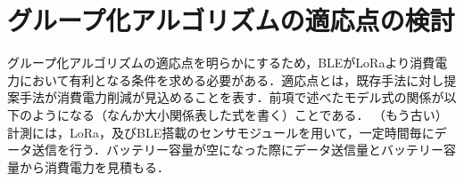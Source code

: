 \section{グループ化アルゴリズムの適応点の検討}
グループ化アルゴリズムの適応点を明らかにするため，BLEがLoRaより消費電力において有利となる条件を求める必要がある．適応点とは，既存手法に対し提案手法が消費電力削減が見込めることを表す．前項で述べたモデル式の関係が以下のようになる（なんか大小関係表した式を書く）ことである．
（もう古い）
計測には，LoRa，及びBLE搭載のセンサモジュールを用いて，一定時間毎にデータ送信を行う．バッテリー容量が空になった際にデータ送信量とバッテリー容量から消費電力を見積もる．